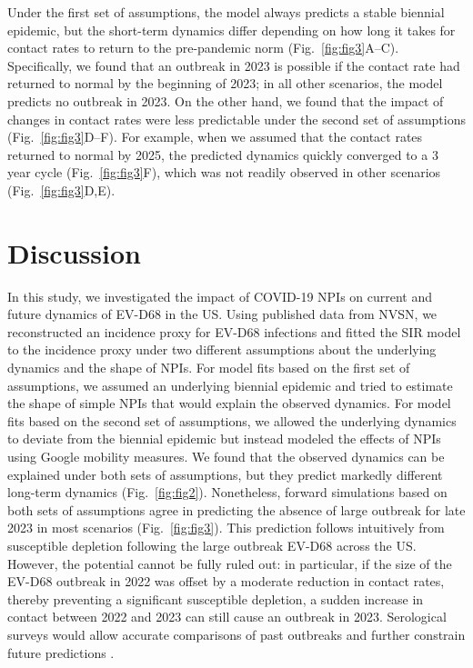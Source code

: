 \documentclass[12pt]{article}
\newcommand{\fref}[1]{Fig.~\ref{fig:#1}}
\begin{document}
Under the first set of assumptions, the model always predicts a stable biennial epidemic, but the short-term dynamics differ depending on how long it takes for contact rates to return to the pre-pandemic norm (\fref{fig3}A--C).
Specifically, we found that an outbreak in 2023 is possible if the contact rate had returned to normal by the beginning of 2023;
in all other scenarios, the model predicts no outbreak in 2023.
On the other hand, we found that the impact of changes in contact rates were less predictable under the second set of assumptions (\fref{fig3}D--F).
For example, when we assumed that the contact rates returned to normal by 2025, the predicted dynamics quickly converged to a 3 year cycle (\fref{fig3}F), which was not readily observed in other scenarios (\fref{fig3}D,E).

\section{Discussion}

In this study, we investigated the impact of COVID-19 NPIs on current and future dynamics of EV-D68 in the US.
Using published data from NVSN, we reconstructed an incidence proxy for EV-D68 infections and fitted the SIR model to the incidence proxy under two different assumptions about the underlying dynamics and the shape of NPIs.
For model fits based on the first set of assumptions, we assumed an underlying biennial epidemic and tried to estimate the shape of simple NPIs that would explain the observed dynamics.
For model fits based on the second set of assumptions, we allowed the underlying dynamics to deviate from the biennial epidemic but instead modeled the effects of NPIs using Google mobility measures.
We found that the observed dynamics can be explained under both sets of assumptions, but they predict markedly different long-term dynamics (\fref{fig2}).
Nonetheless, forward simulations based on both sets of assumptions agree in predicting the absence of large outbreak for late 2023 in most scenarios (\fref{fig3}).
This prediction follows intuitively from susceptible depletion following the large outbreak EV-D68 across the US.
However, the potential cannot be fully ruled out:
in particular, if the size of the EV-D68 outbreak in 2022 was offset by a moderate reduction in contact rates, thereby preventing a significant susceptible depletion, a sudden increase in contact between 2022 and 2023 can still cause an outbreak in 2023.
Serological surveys would allow accurate comparisons of past outbreaks and further constrain future predictions \citep{nguyen2022enterovirus}.
\end{document}
